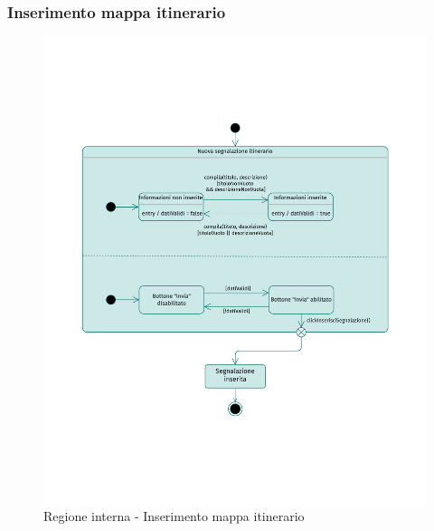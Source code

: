 \documentclass{natourDoc}
\begin{document}
\subsubsection{Inserimento mappa itinerario}
\begin{figure}[!htbp]
	\centering
	\includegraphics[width=\textwidth, page=4]{./diagrams/statechart.pdf}
	\caption{Regione interna - Inserimento mappa itinerario}
\end{figure}
\FloatBarrier

\newpage
\end{document}
